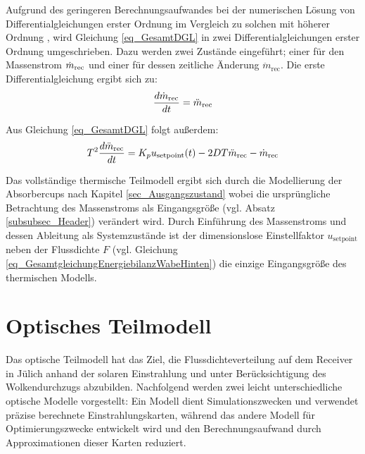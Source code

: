 Aufgrund des geringeren Berechnungsaufwandes bei der numerischen Lösung von Differentialgleichungen erster Ordnung im Vergleich zu solchen mit höherer Ordnung \cite[S.138-139]{Gausch}\cite[S.241ff]{Howell}, wird Gleichung \ref{eq_GesamtDGL} in zwei Differentialgleichungen erster Ordnung umgeschrieben.
Dazu werden zwei Zustände eingeführt; einer für den Massenstrom $\dot{m}_{\mathrm{rec}}$ und einer für dessen zeitliche Änderung $\ddot{m}_{\mathrm{rec}}$.
Die erste Differentialgleichung ergibt sich zu:
\begin{equation} \label{eq_ErsteDGLMassflow}
    \frac{d\dot{m}_{\mathrm{rec}}}{dt} = \ddot{m}_{\mathrm{rec}}
\end{equation}

Aus Gleichung \ref{eq_GesamtDGL} folgt außerdem:
\begin{equation} \label{eq_ZweiteDGLMassflow}
T^2 \frac{d\ddot{m}_{\mathrm{rec}}}{dt} = K_p  u_{\mathrm{setpoint}}(t) - 2 D T \ddot{m}_{\mathrm{rec}} - \dot{m}_{\mathrm{rec}}
\end{equation}

Das vollständige thermische Teilmodell ergibt sich durch die Modellierung der Absorbercups nach Kapitel \ref{sec_Ausgangszustand} wobei die ursprüngliche Betrachtung des Massenstroms als Eingangsgröße (vgl. Absatz \ref{subsubsec_Header}) verändert wird.
Durch Einführung des Massenstroms und dessen Ableitung als Systemzustände ist der dimensionslose Einstellfaktor $u_{\mathrm{setpoint}}$ neben der Flussdichte $F$ (vgl. Gleichung \ref{eq_GesamtgleichungEnergiebilanzWabeHinten}) die einzige Eingangsgröße des thermischen Modells.


\section{Optisches Teilmodell} \label{sec_optischesModell}
Das optische Teilmodell hat das Ziel, die Flussdichteverteilung auf dem Receiver in Jülich anhand der solaren Einstrahlung und unter Berücksichtigung des Wolkendurchzugs abzubilden.
Nachfolgend werden zwei leicht unterschiedliche optische Modelle vorgestellt:
Ein Modell dient Simulationszwecken und verwendet präzise berechnete Einstrahlungskarten, während das andere Modell für Optimierungszwecke entwickelt wird und den Berechnungsaufwand durch Approximationen dieser Karten reduziert.

